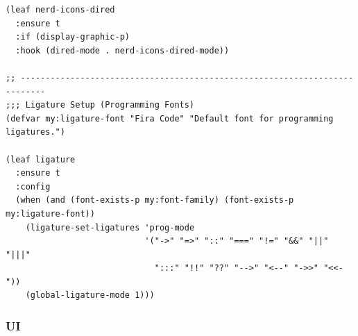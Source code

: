 \documentclass[11pt]{article}
\begin{document}
\begin{verbatim}
(leaf nerd-icons-dired
  :ensure t
  :if (display-graphic-p)
  :hook (dired-mode . nerd-icons-dired-mode))

;; ---------------------------------------------------------------------------
;;; Ligature Setup (Programming Fonts)
(defvar my:ligature-font "Fira Code" "Default font for programming ligatures.")

(leaf ligature
  :ensure t
  :config
  (when (and (font-exists-p my:font-family) (font-exists-p my:ligature-font))
    (ligature-set-ligatures 'prog-mode
                            '("->" "=>" "::" "===" "!=" "&&" "||" "|||"
                              ":::" "!!" "??" "-->" "<--" "->>" "<<-"))
    (global-ligature-mode 1)))
\end{verbatim}
\subsubsection{UI}
\label{sec:org8ce3482}
\end{document}

